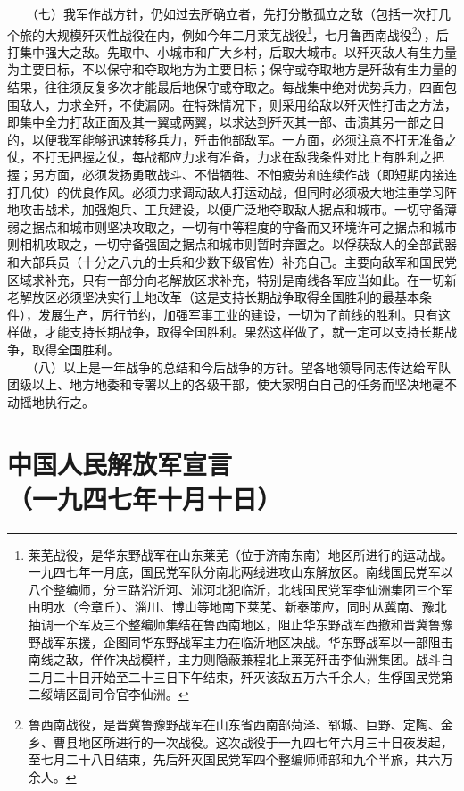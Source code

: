 \documentclass[cn,11pt,chinese]{elegantbook}
\def\myformat#1{\hfil\hfil #1}
\begin{document}
　　（七）我军作战方针，仍如过去所确立者，先打分散孤立之敌（包括一次打几个旅的大规模歼灭性战役在内，例如今年二月莱芜战役\footnote[2]{ 莱芜战役，是华东野战军在山东莱芜（位于济南东南）地区所进行的运动战。一九四七年一月底，国民党军队分南北两线进攻山东解放区。南线国民党军以八个整编师，分三路沿沂河、沭河北犯临沂，北线国民党军李仙洲集团三个军由明水（今章丘）、淄川、博山等地南下莱芜、新泰策应，同时从冀南、豫北抽调一个军及三个整编师集结在鲁西南地区，阻止华东野战军西撤和晋冀鲁豫野战军东援，企图同华东野战军主力在临沂地区决战。华东野战军以一部阻击南线之敌，佯作决战模样，主力则隐蔽兼程北上莱芜歼击李仙洲集团。战斗自二月二十日开始至二十三日下午结束，歼灭该敌五万六千余人，生俘国民党第二绥靖区副司令官李仙洲。}，七月鲁西南战役\footnote[3]{ 鲁西南战役，是晋冀鲁豫野战军在山东省西南部菏泽、郓城、巨野、定陶、金乡、曹县地区所进行的一次战役。这次战役于一九四七年六月三十日夜发起，至七月二十八日结束，先后歼灭国民党军四个整编师师部和九个半旅，共六万余人。}），后打集中强大之敌。先取中、小城市和广大乡村，后取大城市。以歼灭敌人有生力量为主要目标，不以保守和夺取地方为主要目标；保守或夺取地方是歼敌有生力量的结果，往往须反复多次才能最后地保守或夺取之。每战集中绝对优势兵力，四面包围敌人，力求全歼，不使漏网。在特殊情况下，则采用给敌以歼灭性打击之方法，即集中全力打敌正面及其一翼或两翼，以求达到歼灭其一部、击溃其另一部之目的，以便我军能够迅速转移兵力，歼击他部敌军。一方面，必须注意不打无准备之仗，不打无把握之仗，每战都应力求有准备，力求在敌我条件对比上有胜利之把握；另方面，必须发扬勇敢战斗、不惜牺牲、不怕疲劳和连续作战（即短期内接连打几仗）的优良作风。必须力求调动敌人打运动战，但同时必须极大地注重学习阵地攻击战术，加强炮兵、工兵建设，以便广泛地夺取敌人据点和城市。一切守备薄弱之据点和城市则坚决攻取之，一切有中等程度的守备而又环境许可之据点和城市则相机攻取之，一切守备强固之据点和城市则暂时弃置之。以俘获敌人的全部武器和大部兵员（十分之八九的士兵和少数下级官佐）补充自己。主要向敌军和国民党区域求补充，只有一部分向老解放区求补充，特别是南线各军应当如此。在一切新老解放区必须坚决实行土地改革（这是支持长期战争取得全国胜利的最基本条件），发展生产，厉行节约，加强军事工业的建设，一切为了前线的胜利。只有这样做，才能支持长期战争，取得全国胜利。果然这样做了，就一定可以支持长期战争，取得全国胜利。\\
　　（八）以上是一年战争的总结和今后战争的方针。望各地领导同志传达给军队团级以上、地方地委和专署以上的各级干部，使大家明白自己的任务而坚决地毫不动摇地执行之。\\
\newpage\section*{\myformat{中国人民解放军宣言}\\\myformat{（一九四七年十月十日）}}
\end{document}
